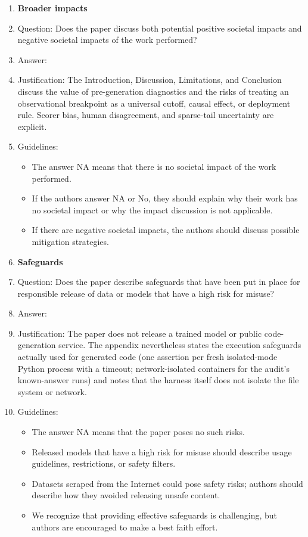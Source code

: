 \begin{enumerate}
\item {\bf Broader impacts}
    \item[] Question: Does the paper discuss both potential positive societal impacts and negative societal impacts of the work performed?
    \item[] Answer: \answerYes{}
    \item[] Justification: The Introduction, Discussion, Limitations, and Conclusion discuss the value of pre-generation diagnostics and the risks of treating an observational breakpoint as a universal cutoff, causal effect, or deployment rule. Scorer bias, human disagreement, and sparse-tail uncertainty are explicit.
    \item[] Guidelines:
    \begin{itemize}
        \item The answer NA means that there is no societal impact of the work performed.
        \item If the authors answer NA or No, they should explain why their work has no societal impact or why the impact discussion is not applicable.
        \item If there are negative societal impacts, the authors should discuss possible mitigation strategies.
    \end{itemize}

\item {\bf Safeguards}
    \item[] Question: Does the paper describe safeguards that have been put in place for responsible release of data or models that have a high risk for misuse?
    \item[] Answer: \answerNA{}
    \item[] Justification: The paper does not release a trained model or public code-generation service. The appendix nevertheless states the execution safeguards actually used for generated code (one assertion per fresh isolated-mode Python process with a timeout; network-isolated containers for the audit's known-answer runs) and notes that the harness itself does not isolate the file system or network.
    \item[] Guidelines:
    \begin{itemize}
        \item The answer NA means that the paper poses no such risks.
        \item Released models that have a high risk for misuse should describe usage guidelines, restrictions, or safety filters.
        \item Datasets scraped from the Internet could pose safety risks; authors should describe how they avoided releasing unsafe content.
        \item We recognize that providing effective safeguards is challenging, but authors are encouraged to make a best faith effort.
    \end{itemize}


\end{enumerate}

